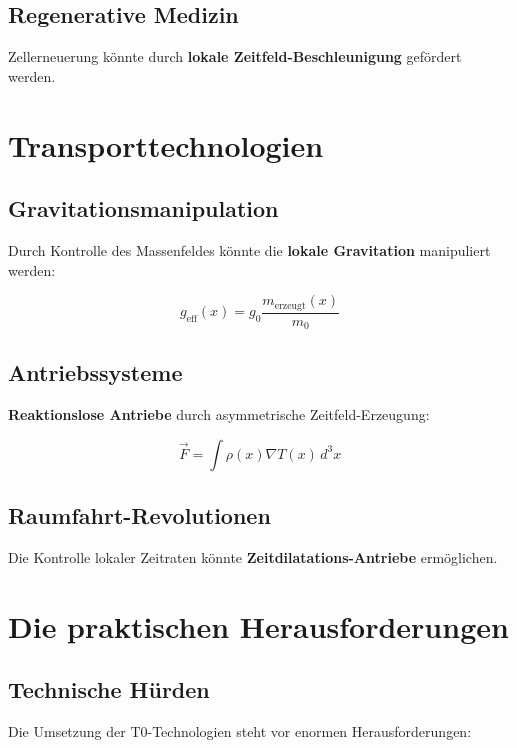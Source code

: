 \documentclass[12pt,a4paper]{report}
\begin{document}
	\subsection{Regenerative Medizin}
	
	Zellerneuerung könnte durch \textbf{lokale Zeitfeld-Beschleunigung} gefördert werden.
	
	\section{Transporttechnologien}
	
	\subsection{Gravitationsmanipulation}
	
	Durch Kontrolle des Massenfeldes könnte die \textbf{lokale Gravitation} manipuliert werden:
	
	\begin{equation}
		g_{\text{eff}}(x) = g_0 \frac{m_{\text{erzeugt}}(x)}{m_0}
	\end{equation}
	
	\subsection{Antriebssysteme}
	
	\textbf{Reaktionslose Antriebe} durch asymmetrische Zeitfeld-Erzeugung:
	
	\begin{equation}
		\vec{F} = \int \rho(x) \nabla T(x) \, d^3x
	\end{equation}
	
	\subsection{Raumfahrt-Revolutionen}
	
	Die Kontrolle lokaler Zeitraten könnte \textbf{Zeitdilatations-Antriebe} ermöglichen.
	
	\section{Die praktischen Herausforderungen}
	
	\subsection{Technische Hürden}
	
	Die Umsetzung der T0-Technologien steht vor enormen Herausforderungen:
	
\end{document}
